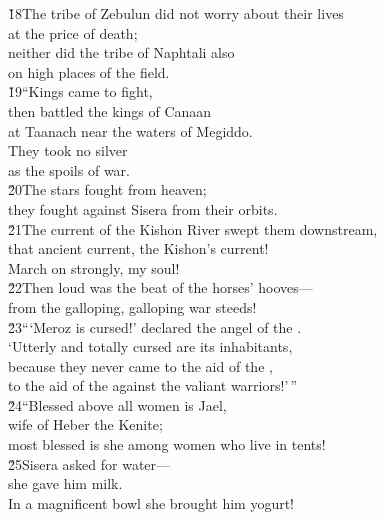 \begin{poetry}
\poeml \v{18}The tribe of Zebulun did not worry about their lives \\
\poemll    at the price of death; \\
\poeml neither did the tribe of Naphtali also \\
\poemll    on high places of the field. \\
\poeml \v{19}``Kings came to fight, \\
\poemll    then battled the kings of Canaan \\
\poemlll       at Taanach near the waters of Megiddo. \\
\poeml They took no silver \\
\poemll    as the spoils of war. \\
\poeml \v{20}The stars fought from heaven; \\
\poemll    they fought against Sisera from their orbits. \\
\poeml \v{21}The current of the Kishon River swept them downstream, \\
\poemll    that ancient current, the Kishon's current! \\
\poemlll       March on strongly, my soul! \\
\poeml \v{22}Then loud was the beat of the horses' hooves--- \\
\poemll    from the galloping, galloping war steeds! \\
\poeml \v{23}```Meroz is cursed!' declared the angel of the . \\
\poemll    `Utterly and totally cursed are its inhabitants, \\
\poeml because they never came to the aid of the , \\
\poemll    to the aid of the  against the valiant warriors!'\,'' \\
\poeml \v{24}``Blessed above all women is Jael, \\
\poemll    wife of Heber the Kenite; \\
\poemlll       most blessed is she among women who live in tents! \\
\poeml \v{25}Sisera asked for water--- \\
\poemll    she gave him milk. \\
\poemlll       In a magnificent bowl she brought him yogurt! \\

\end{poetry}
